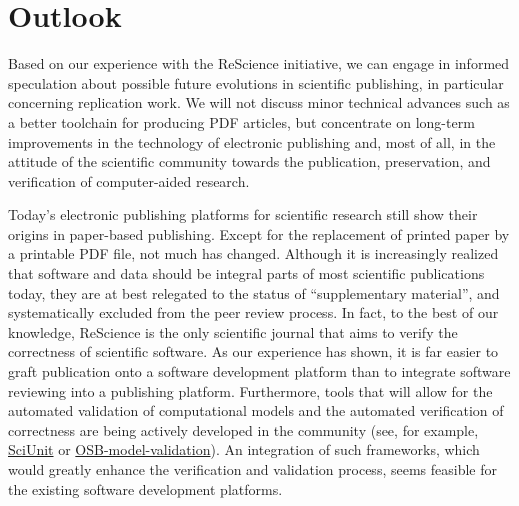 \documentclass[11pt]{article}
\begin{document}
\section*{Outlook}

Based on our experience with the ReScience initiative, we can engage
in informed speculation about possible future evolutions in scientific
publishing, in particular concerning replication work. We will not
discuss minor technical advances such as a better toolchain for
producing PDF articles, but concentrate on long-term improvements in
the technology of electronic publishing and, most of all, in the
attitude of the scientific community towards the publication,
preservation, and verification of computer-aided research.


Today's electronic publishing platforms for scientific research still
show their origins in paper-based publishing. Except for the
replacement of printed paper by a printable PDF file, not much has
changed. Although it is increasingly realized that software and data
should be integral parts of most scientific publications today, they
are at best relegated to the status of ``supplementary material'', and
systematically excluded from the peer review process. In fact, to the
best of our knowledge, ReScience is the only scientific journal that
aims to verify the correctness of scientific software. As our
experience has shown, it is far easier to graft publication onto a
software development platform than to integrate software reviewing
into a publishing platform. Furthermore, tools that will allow for the automated
validation of computational models and the automated verification of correctness are being actively 
developed in the community (see, for example, 
\href{https://github.com/scidash/sciunit}{SciUnit} or 
\href{https://github.com/OpenSourceBrain/osb-model-validation}{OSB-model-validation}). 
An integration of such frameworks, which would greatly enhance the 
verification and validation process, seems feasible for the existing software 
development platforms.
\end{document}
